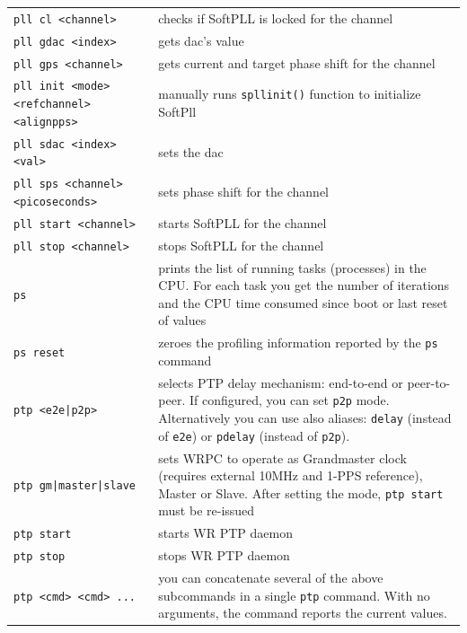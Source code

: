 \documentclass[a4paper, 12pt]{article}
\renewcommand{\_}{\underscore\allowbreak}
\newcommand{\code}[1]{\texttt{#1}}
\begin{document}
\begin{longtable}{  p{7.5cm}  p{7cm} }
  \code{pll cl <channel>} & checks if SoftPLL is locked for the channel \\

  \code{pll gdac <index>} & gets dac's value \\

  \code{pll gps <channel>} & gets current and target phase shift for the
    channel \\

  \code{pll init <mode> <ref\_channel> <align\_pps>} & manually runs
    \texttt{spll\_init()} function to initialize SoftPll  \\

  \code{pll sdac <index> <val>} & sets the dac \\

  \code{pll sps <channel> <picoseconds>} & sets phase shift for the channel \\

  \code{pll start <channel>} & starts SoftPLL for the channel \\

  \code{pll stop <channel>} & stops SoftPLL for the channel \\

  \code{ps} & prints the list of running tasks (processes) in the CPU. For
    each task you get the number of iterations and the CPU time consumed since
    boot or last reset of values \\

  \code{ps reset} & zeroes the profiling information reported by the \code{ps}
    command \\

  \code{ptp <e2e|p2p>} & selects PTP delay mechanism: end-to-end or peer-to-peer.
    If configured, you can set \texttt{p2p} mode. Alternatively you can use also
    aliases: \texttt{delay} (instead of \texttt{e2e}) or \texttt{pdelay}
    (instead of \texttt{p2p}).\\

  \code{ptp gm|master|slave} & sets WRPC to operate as Grandmaster clock
    (requires external 10MHz and 1-PPS reference), Master or Slave. After
    setting the mode, \texttt{ptp start} must be re-issued \\

  \code{ptp start} & starts WR PTP daemon \\

  \code{ptp stop} & stops WR PTP daemon \\

  \code{ptp <cmd> <cmd> ...} & you can concatenate several of the above
    subcommands in a single \texttt{ptp} command. With no arguments,
    the command reports the current values.\\


\end{longtable}
\end{document}
